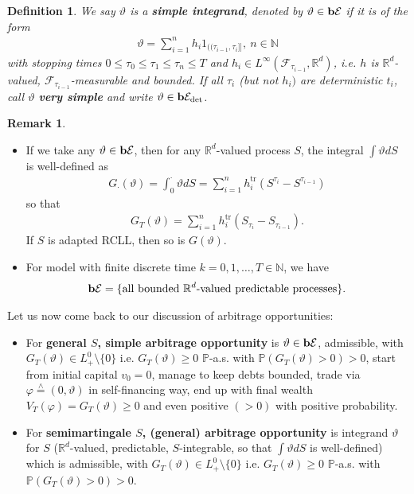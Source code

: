 \documentclass[12pt,a4paper, twoside]{article}
\newtheorem{defn}{Definition}[section]
\theoremstyle{definition}
\newtheorem{rem}{Remark}[section]
\newcommand{\PP}{\mathbb{P}} %
\newcommand{\teq}{\overset{\wedge}{=}}
\newcommand{\simple}{\textbf{\text{b}}\mathcal{E}}
\newcommand{\verysimple}{\textbf{\text{b}}\mathcal{E}_{\text{det}}}
\begin{document}
\begin{defn} We say $\vartheta$ is a \textbf{simple integrand}, denoted by $\vartheta \in \simple$ if it is of the form 
\begin{align*}
\vartheta = \sum_{i=1}^n h_i 1_{(\!( \tau_{i-1}, \tau_i ]\!]}, \ n \in \mathbb{N}
\end{align*}
with stopping times $0 \leq \tau_0 \leq \tau_1 \leq \tau_n \leq T$ and $h_i \in L^\infty ( \mathcal{F}_{\tau_{i-1}}, \mathbb{R}^d)$, i.e. $h$ is $\mathbb{R}^d$-valued, $ \mathcal{F}_{\tau_{i-1}}$-measurable and bounded. If all $\tau_i$ (but not $h_i)$ are deterministic $t_i$, call $\vartheta$ \textbf{very simple} and write $\vartheta \in \verysimple$. 
\end{defn}
\newpage
\begin{rem} \
\begin{itemize}
\item If we take any $\vartheta \in \simple$, then for any $\mathbb{R}^d$-valued process $S$, the integral $ \int \vartheta dS$ is well-defined as 
\begin{align*}
G_\cdot ( \vartheta) = \int_0^\cdot \vartheta dS = \sum_{i=1}^n h_i^{\text{tr}}(S^{\tau_i}- S^{\tau_{i-1}}) 
\end{align*}
so that 
\begin{align*}
G_T( \vartheta) = \sum_{i=1}^n h_i^{\text{tr}} (S_{\tau_i}-S_{\tau_{i-1}}).
\end{align*}
If $S$ is adapted RCLL, then so is $G( \vartheta)$. 
\item For model with finite discrete time $k=0,1, \dots , T \in \mathbb{N}$, we have
\begin{align*}
\simple = \{\text{all bounded $\mathbb{R}^d$-valued predictable processes}\}.
\end{align*}
\end{itemize}
\end{rem}
Let us now come back to our discussion of arbitrage opportunities:
\begin{itemize}
\item For \textbf{general $S$, simple arbitrage opportunity} is $\vartheta \in \simple$, admissible, with $G_T( \vartheta) \in L_+^0\setminus \{0 \}$ i.e. $G_T( \vartheta) \geq 0$ $\PP$-a.s. with $\PP( G_T( \vartheta) >0)>0$, start from initial capital $v_0=0$, manage to keep debts bounded, trade via $\varphi \teq (0, \vartheta)$ in self-financing way, end up with final wealth $V_T( \varphi) = G_T( \vartheta) \geq 0$ and even positive $(>0)$ with positive probability. 
\item For \textbf{semimartingale $S$, (general) arbitrage opportunity} is integrand $\vartheta$ for $S$ ($\mathbb{R}^d$-valued, predictable, $S$-integrable, so that $\int \vartheta dS$ is well-defined) which is admissible, with $G_T( \vartheta) \in L_+^0 \setminus \{0\}$ i.e. $G_T( \vartheta) \geq 0$ $\PP$-a.s. with $\PP( G_T( \vartheta) >0)>0$. 
\end{itemize}
\end{document}
